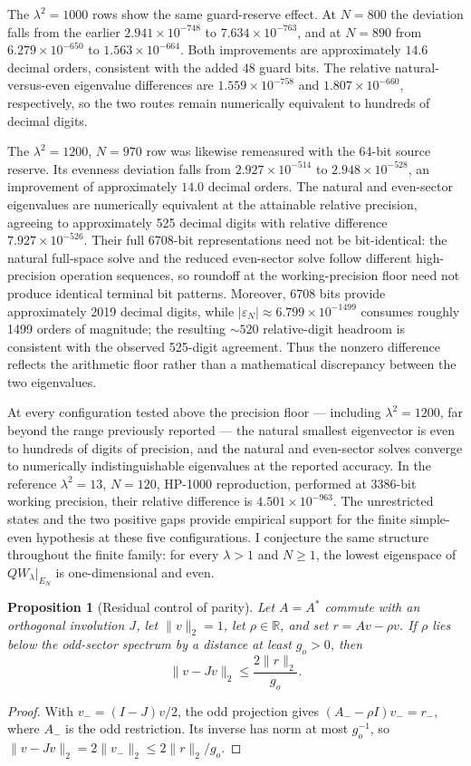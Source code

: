 \documentclass[11pt,a4paper]{article}
\newtheorem{proposition}{Proposition}
\begin{document}
The $\lambda^2{=}1000$ rows show the same guard-reserve effect. At
$N{=}800$ the deviation falls from the earlier
$2.941\times10^{-748}$ to $7.634\times10^{-763}$, and at $N{=}890$
from $6.279\times10^{-650}$ to $1.563\times10^{-664}$. Both
improvements are approximately $14.6$ decimal orders, consistent
with the added 48 guard bits. The relative natural-versus-even
eigenvalue differences are $1.559\times10^{-758}$ and
$1.807\times10^{-660}$, respectively, so the two routes remain
numerically equivalent to hundreds of decimal digits.

The $\lambda^2{=}1200$, $N{=}970$ row was likewise remeasured with
the 64-bit source reserve. Its evenness deviation falls from
$2.927\times10^{-514}$ to $2.948\times10^{-528}$, an improvement of
approximately $14.0$ decimal orders. The natural and even-sector
eigenvalues are numerically equivalent at the attainable relative
precision, agreeing to approximately 525 decimal digits with relative
difference $7.927\times10^{-526}$. Their full 6708-bit
representations need not be bit-identical: the natural full-space
solve and the reduced even-sector solve follow different high-precision
operation sequences, so roundoff at the working-precision floor need
not produce identical terminal bit patterns.
Moreover, 6708 bits provide approximately 2019 decimal digits, while
$|\varepsilon_N|\approx 6.799\times10^{-1499}$ consumes roughly 1499
orders of magnitude; the resulting ${\sim}520$ relative-digit
headroom is consistent with the observed 525-digit agreement. Thus
the nonzero difference reflects the arithmetic floor rather than a
mathematical discrepancy between the two eigenvalues.

At every configuration tested above the precision floor --- including
$\lambda^2 = 1200$, far beyond the range previously reported --- the
natural smallest eigenvector is even to hundreds of digits of precision,
and the natural and even-sector solves converge to numerically
indistinguishable eigenvalues at the reported accuracy. In the reference
$\lambda^2{=}13$, $N{=}120$, HP-1000 reproduction, performed at 3386-bit
working precision, their relative difference is
$4.501 \times 10^{-963}$. The unrestricted states and the two positive gaps provide empirical
support for the finite simple-even hypothesis at these five
configurations. I conjecture the same structure throughout the finite
family: for every $\lambda>1$ and $N\geq1$, the lowest eigenspace of
$QW_\lambda|_{E_N}$ is one-dimensional and even.

\begin{proposition}[Residual control of parity]
\label{prop:parity_residual}
Let $A=A^*$ commute with an orthogonal involution $J$, let
$\|v\|_2=1$, let $\rho\in\mathbb{R}$, and set $r=Av-\rho v$.
If $\rho$ lies below the odd-sector spectrum by a distance at least
$g_o>0$, then
\[
\|v-Jv\|_2\leq \frac{2\|r\|_2}{g_o}.
\]
\end{proposition}
\begin{proof}
With $v_-=(I-J)v/2$, the odd projection gives
$(A_--\rho I)v_-=r_-$, where $A_-$ is the odd restriction.
Its inverse has norm at most $g_o^{-1}$, so
$\|v-Jv\|_2=2\|v_-\|_2\leq2\|r\|_2/g_o$.
\end{proof}
\end{document}

